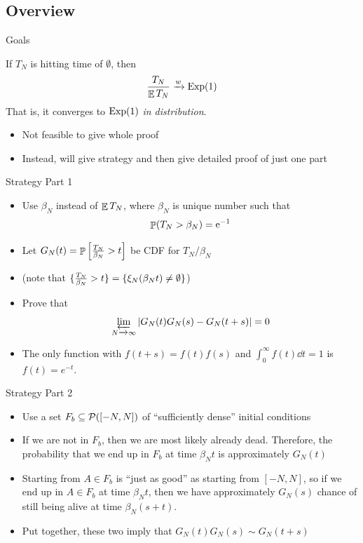 \documentclass{beamer}
\begin{document}
\subsection{Overview}

\begin{frame}{Goals}
  \begin{theorem}
    If $T_{N}$ is hitting time of $\emptyset$, then
    \[ \frac{T_{N}}{\E T_{N}} \to[w] \expDist(1) \]
    That is, it converges to $\expDist(1)$ \emph{in distribution}.
  \end{theorem}
  \pause
  \begin{itemize}
    \item Not feasible to give whole proof
          \pause
    \item Instead, will give strategy and then give detailed proof of just one part
  \end{itemize}
\end{frame}

\begin{frame}{Strategy Part 1}
  \begin{itemize}
    \item Use $\beta_{N}$ instead of $\E T_{N}$, where $\beta_{N}$ is unique number such that
    \[ \Prob(T_{N} > \beta_{N}) = \e^{-1} \]
          \pause
    \item Let $G_{N}(t) = \Prob\left[ \frac{T_{N}}{\beta_{N}} > t\right]$ be CDF for $T_{N} / \beta_{N}$
          \pause
    \item(note that $\set{ \frac{T_N}{\beta_N} > t} = \set{\xi_{N}(\beta_{N}t) \neq \emptyset}$)
          \pause
    \item Prove that
          \[ \limas_{N \to \infty} \abs{G_{N}(t)G_{N}(s) - G_{N}(t+s)} = 0 \]
    \item The only function with $f(t+s) = f(t)f(s)$ and $\int_{0}^{\infty} f(t) \dd{t} = 1$ is $f(t) = e^{-t}$.
  \end{itemize}
\end{frame}

\begin{frame}{Strategy Part 2}
  \begin{itemize}
    \item Use a set $F_{b} \ins \powerset([-N,N])$ of ``sufficiently dense'' initial conditions
    \pause
    \item If we are not in $F_{b}$, then we are most likely already dead. Therefore, the probability that we end up in $F_{b}$ at time $\beta_{N}t$ is approximately $G_{N}(t)$
    \pause
    \item Starting from $A \in F_{b}$ is ``just as good'' as starting from $[-N,N]$, so if we end up in $A \in F_{b}$ at time $\beta_{N}t$, then we have approximately $G_{N}(s)$ chance of still being alive at time $\beta_{N}(s+t)$.
    \pause
    \item Put together, these two imply that $G_{N}(t)G_{N}(s) \sim G_{N}(t+s)$
  \end{itemize}
\end{frame}
\end{document}
